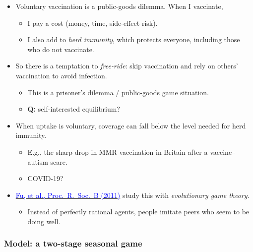 \documentclass[20pt]{extarticle}
\newcommand{\hrefc}[2]{\href{#1}{\textcolor{blue}{#2}}}
\begin{document}
\begin{itemize}
\item Voluntary vaccination is a public-goods dilemma. When I vaccinate,
	\begin{itemize}
	\item I pay a cost (money, time, side-effect risk).
	\item I also add to \emph{herd immunity}, which protects everyone, including those who do not vaccinate.
	\end{itemize}
\item So there is a temptation to \emph{free-ride}: skip vaccination and rely on others' vaccination to avoid infection.
	\begin{itemize}
	\item This is a prisoner's dilemma / public-goods game situation.
	\item \textbf{Q:} self-interested equilibrium? 
	\end{itemize}
\item When uptake is voluntary, coverage can fall below the level needed for herd immunity.
	\begin{itemize}
	\item E.g., the sharp drop in MMR vaccination in Britain after a vaccine--autism scare.
	\item COVID-19?
	\end{itemize}
\item \hrefc{https://doi.org/10.1098/rspb.2010.1107}{Fu, et al., Proc.\ R.\ Soc.\ B (2011)} study this with \emph{evolutionary game theory}.
	\begin{itemize}
	\item Instead of perfectly rational agents, people imitate peers who seem to be doing well.
	\end{itemize}
\end{itemize}

\subsubsection*{Model: a two-stage seasonal game}
\end{document}
